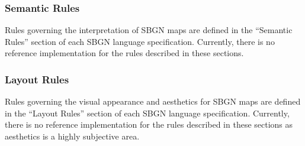 \subsubsection{Semantic Rules}

Rules governing the interpretation of SBGN maps are defined in the ``Semantic Rules'' section of each SBGN language specification. Currently, there is no reference implementation for the rules described in these sections. 

\subsubsection{Layout Rules}

Rules governing the visual appearance and aesthetics for SBGN maps are defined in the ``Layout Rules'' section of each SBGN language specification. Currently, there is no reference implementation for the rules described in these sections as aesthetics is a highly subjective area. 
